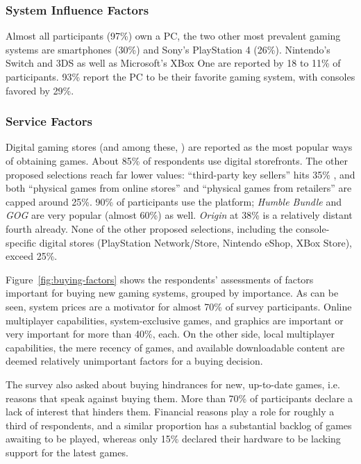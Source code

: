 \subsubsection{System Influence Factors}
Almost all participants (97\%) own a PC, the two other most prevalent
gaming systems are smartphones (30\%) and Sony's PlayStation 4 (26\%).
Nintendo's Switch and 3DS as well as Microsoft's XBox One are reported
by 18 to 11\% of participants.
93\% report the PC to be their favorite gaming system, with consoles
favored by 29\%.



\subsubsection{Service Factors}

Digital gaming stores (and among these, \steam) are reported as
the most popular ways of obtaining games. About 85\% of respondents
use digital storefronts. The other proposed selections reach far lower
values: ``third-party key sellers'' hits 35\% , and both ``physical
games from online stores'' and ``physical games from retailers''
are capped around 25\%.
90\% of participants use the \steam platform; \textit{Humble Bundle}
and \textit{GOG} are very popular (almost 60\%) as well. \textit{Origin}
at 38\% is a relatively distant fourth already. None of the other
proposed selections, including the console-specific digital stores
(PlayStation Network/Store, Nintendo eShop, XBox Store), exceed
25\%.

Figure~\ref{fig:buying-factors} shows the respondents' assessments
of factors important for buying new gaming systems, grouped by
importance. As can be seen, system prices are a motivator for
almost 70\% of survey participants. Online multiplayer capabilities,
system-exclusive games, and graphics are important or very important
for more than 40\%, each. On the other side, local multiplayer
capabilities, the mere recency of games, and available downloadable
content are deemed relatively unimportant factors for a buying decision.

The survey also asked about buying hindrances for new, up-to-date
games, i.e. reasons that speak against buying them.
More than 70\% of participants declare a lack of interest
that hinders them. Financial reasons play a role for roughly
a third of respondents, and a similar proportion has a substantial
backlog of games awaiting to be played, whereas only 15\% declared
their hardware to be lacking support for the latest games.


